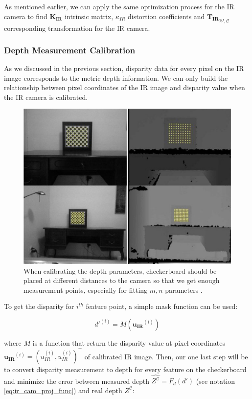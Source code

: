 \documentclass[a4paper]{report}
\numberwithin{figure}{section}
\begin{document}
As mentioned earlier, we can apply the same optimization process for the IR 
camera 
to find $\mathbf{K_{IR}}$ intrinsic matrix, $\kappa_{IR}$ 
distortion coefficients and ${\mathbf{T_{IR}}}_{\mathcal{W}, 
	\mathcal{C}}$ corresponding transformation for the IR camera.


\subsubsection{Depth Measurement Calibration}

As we discussed in the previous section, disparity data for every pixel on the 
IR 
image corresponds to the metric depth information.  We can only build the 
relationship between pixel coordinates of the IR image and disparity value 
when the IR camera is calibrated.

\begin{figure}[H]
	\centering
  \includegraphics[width=0.7\linewidth,natwidth=640,natheight=640]
  {fig/ref_imgs/checkerboard_depth.png}
  \caption[Checkboard Calibration for Depth]{When calibrating the depth 
  parameters, checkerboard should be placed at different distances to the 
  camera so that we get enough measurement points, especially for fitting 
  $m,n$ parameters \parencite{Karan2015}.}
  \label{fig:checkerboard_depth}
\end{figure}

To get the disparity for $i^{th}$ feature point, a simple mask function can be 
used:

\begin{equation}
  d'^{(i)} = M(\mathbf{u_{IR}}^{(i)})
\end{equation}

where $M$ is a function that return the disparity value at pixel coordinates 
$\mathbf{u_{IR}}^{(i)}=(u_{IR}^{(i)},u_{IR}^{(i)})^\top$ of calibrated IR 
image.  
Then, our one last step will be to convert disparity measurement to depth for 
every feature on the checkerboard and minimize the error between measured 
depth 
$\hat{Z^{\mathcal{C}}}=F_d(d')$ (see notation \eqref{eq:ir_cam_proj_func}) and 
real depth 
$Z^{\mathcal{C}}$:
\end{document}
